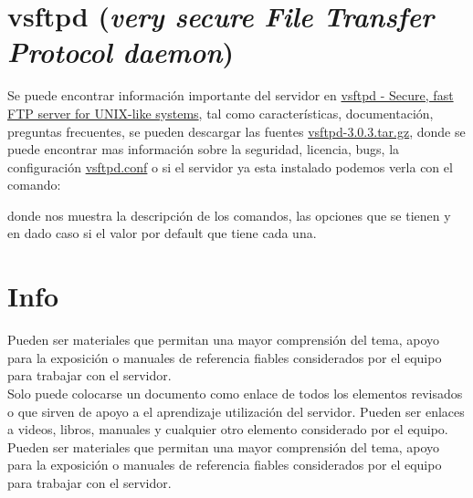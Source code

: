\section{vsftpd ({\em very secure File Transfer Protocol daemon})}
  
  Se puede encontrar informaci\'on importante del servidor en 
  \href{https://security.appspot.com/vsftpd.html}
  {vsftpd - Secure, fast FTP server for UNIX-like systems}, tal como caracter\'isticas, 
  documentaci\'on, preguntas frecuentes, se pueden descargar las fuentes
  \href{https://security.appspot.com/downloads/vsftpd-3.0.3.tar.gz}{vsftpd-3.0.3.tar.gz}, donde se 
  puede encontrar mas informaci\'on sobre la seguridad, licencia, bugs, la configuraci\'on 
  \href{http://vsftpd.beasts.org/vsftpd_conf.html}{vsftpd.conf} o si el servidor ya esta instalado 
  podemos verla con el comando:    
  \begin{shell}
  \hline\end{shell}
  donde nos muestra la descripci\'on de los comandos, las opciones que se tienen y en dado caso si 
  el valor por default que tiene cada una.
  
\section{Info}
  Pueden ser materiales que permitan una mayor comprensión del tema, apoyo para la exposición o 
  manuales de referencia fiables considerados por el equipo para trabajar con el servidor.\\
  
  Solo puede colocarse un documento como enlace de todos los elementos revisados o que sirven de 
  apoyo a el aprendizaje utilización del servidor. Pueden ser enlaces a videos, libros, manuales y 
  cualquier otro elemento considerado por el equipo.\\
  
  Pueden ser materiales que permitan una mayor comprensión del tema, apoyo para la exposición o 
  manuales de referencia fiables considerados por el equipo para trabajar con el servidor.\\
  
